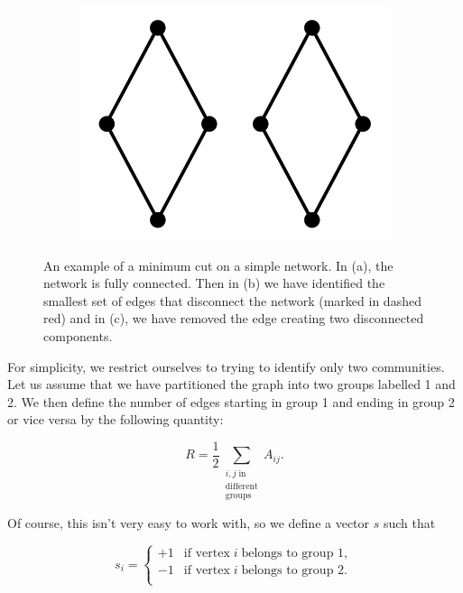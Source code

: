 \begin{figure}[H]
\begin{center}
\begin{subfigure}[b]{0.3\textwidth}
            \includegraphics[width=\textwidth]{img/3/3}
            \caption{}
            \label{}
        \end{subfigure}
    \end{center}
    \caption{An example of a minimum cut on a simple network. In (a), the network is fully connected. Then in (b) we have identified the smallest set of edges that disconnect the network (marked in dashed red) and in (c), we have removed the edge creating two disconnected components.}
    \label{fig:spectral_cut}
\end{figure}

\newpage
For simplicity, we restrict ourselves to trying to identify only two communities. Let us assume that we have partitioned the graph into two groups labelled 1 and 2. We then define the number of edges starting in group 1 and ending in group 2 or vice versa by the following quantity:

$$ R = \frac{1}{2} \sum_{\substack{i, j \; \text{in} \\ \text{different} \\ \text{groups}}} A_{ij}. $$

\noindent
Of course, this isn't very easy to work with, so we define a vector $s$ such that

$$ s_i = 
\begin{cases}
    +1 & \text{if vertex} \; i \; \text{belongs to group 1}, \\
    -1 & \text{if vertex} \; i \; \text{belongs to group 2}. \\
\end{cases}
$$

